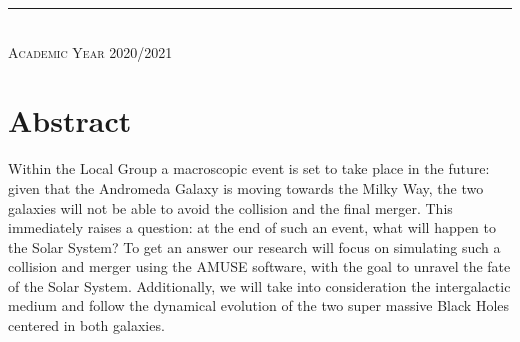 \documentclass[10pt,english]{article}
\begin{document}
\begin{titlepage}
\begin{center}
\rule{125mm}{0.1mm} \\
\vspace{5pt}
\scshape{\large{Academic Year 2020/2021}} \\

\end{center}
\makeatother
\end{titlepage}


\section{Abstract}
\label{abstract}
Within the Local Group a macroscopic event is set to take place in the future: given that the Andromeda Galaxy is moving towards the Milky Way, the two galaxies will not be able to avoid the collision and the final merger. This immediately raises a question: at the end of such an event, what will happen to the Solar System? To get an answer our research will focus on simulating such a collision and merger using the AMUSE software, with the goal to unravel the fate of the Solar System. Additionally, we will take into consideration the intergalactic medium and follow the dynamical evolution of the two super massive Black Holes centered in both galaxies.\par 
\smallskip
\end{document}
